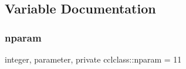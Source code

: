 \subsection{Variable Documentation}
\mbox{\label{namespacecclclass_adeb399ff41e54cda7bdefa51063c0de6}} 
\subsubsection{\texorpdfstring{nparam}{nparam}}
{\footnotesize\ttfamily integer, parameter, private cclclass\+::nparam = 11\hspace{0.3cm}{\ttfamily [private]}}

